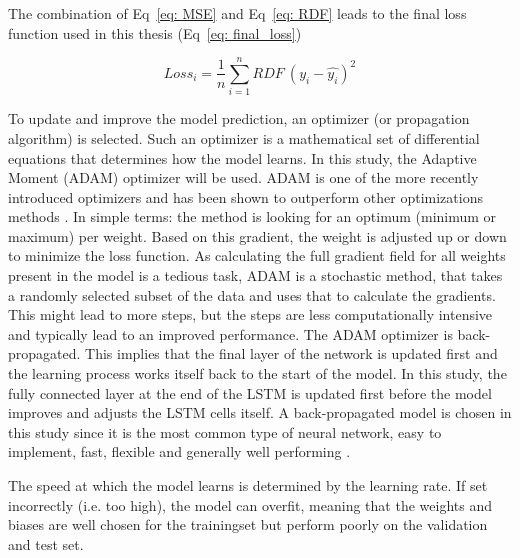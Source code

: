 \documentclass[twocolumn, 10pt, a4paper]{memoir}
\begin{document}
	The combination of Eq~\ref{eq: MSE} and Eq~\ref{eq: RDF} leads to the final loss function used in this thesis (Eq~\ref{eq: final_loss})
	
	\begin{equation}
		\label{eq: final_loss}
		Loss_i = \frac{1}{n} \sum_{i=1}^{n} RDF \ (y_i - \hat{y_i})^2
	\end{equation}
	
	To update and improve the model prediction, an optimizer (or propagation algorithm) is selected. Such an optimizer is a mathematical set of differential equations that determines how the model learns. In this study, the Adaptive Moment (ADAM) optimizer will be used. ADAM is one of the more recently introduced optimizers and has been shown to outperform other optimizations methods \cite{Kingma2014}. In simple terms: the method is looking for an optimum (minimum or maximum) per weight. Based on this gradient, the weight is adjusted up or down to minimize the loss function. As calculating the full gradient field for all weights present in the model is a tedious task, ADAM is a stochastic method, that takes a randomly selected subset of the data and uses that to calculate the gradients. This might lead to more steps, but the steps are less computationally intensive and typically lead to an improved performance.  
	The ADAM optimizer is back-propagated. This implies that the final layer of the network is updated first and the learning process works itself back to the start of the model. In this study, the fully connected layer at the end of the LSTM is updated first before the model improves and adjusts the LSTM cells itself. A back-propagated model is chosen in this study since it is the most common type of neural network, easy to implement, fast, flexible and generally well performing \cite{Staudemeyer2019}.
	
	The speed at which the model learns is determined by the learning rate. If set incorrectly (i.e. too high), the model can overfit, meaning that the weights and biases are well chosen for the trainingset but perform poorly on the validation and test set. 
	
\end{document}
